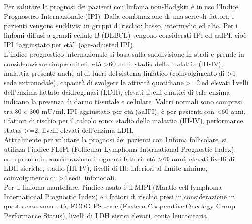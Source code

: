 Per valutare la prognosi dei pazienti con linfoma non-Hodgkin è in uso l’Indice Prognostico Internazionale (IPI). 
Dalla combinazione di una serie di fattori, i pazienti vengono suddivisi in gruppi di rischio: basso, intermedio 
ed alto. 
Per i linfomi diffusi a grandi cellule B (DLBCL) vengono considerati IPI ed aaIPI, cioè IPI “aggiustato per età” 
(age-adjusted IPI)\cite{AIOM}.\\
L’indice prognostico internazionale si basa sulla suddivisione in stadi e prende in considerazione cinque criteri: 
età >60 anni, stadio della malattia (III-IV), malattia presente anche al di fuori del sistema linfatico 
(coinvolgimento di >1 sede extranodale), capacità di svolgere le attività quotidiane >=2 ed elevati livelli 
dell’enzima lattato-deidrogenasi (LDH); elevati livelli ematici di tale enzima indicano la presenza di 
danno tissutale e cellulare. Valori normali sono compresi tra 80 e 300 mU/ml. 
IPI aggiustato per età (aaIPI), è per pazienti con <60 anni, i fattori di rischio per il calcolo sono: 
stadio della malattia (III-IV), performance status >=2, livelli elevati dell’enzima LDH\cite{AIOM}.\\
Attualmente per valutare la prognosi dei pazienti con linfoma follicolare, si utilizza l’indice FLIPI 
(Follicular Lymphoma International Prognostic Index), esso prende in considerazione i seguenti fattori: 
età >60 anni, elevati livelli di LDH sieriche, stadio (III-IV), livelli di Hb inferiori al limite minimo, 
coinvolgimento di >4 sedi linfonodali\cite{AIOM}.\\
Per il linfoma mantellare, l’indice usato è il MIPI (Mantle cell lymphoma International Prognostic Index) e 
i fattori di rischio presi in considerazione in questo caso sono: età, ECOG PS scale 
(Eastern Cooperative Oncology Group Performance Status), livelli di LDH sierici elevati, conta leucocitaria\cite{MIPI}.\\

